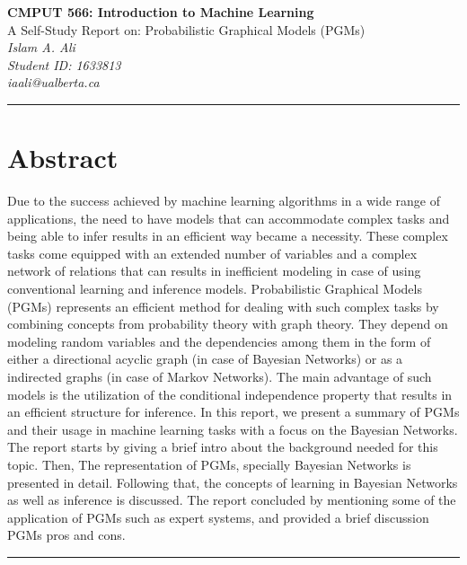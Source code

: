 \documentclass{article}
\begin{document}
\begin{center}
{\bf CMPUT 566: Introduction to Machine Learning}  \\
{A Self-Study Report on: Probabilistic Graphical Models (PGMs)} \\
\vspace{.1in}
{\em Islam A. Ali}\\
{\em Student ID: 1633813}\\
{\em iaali@ualberta.ca}\\
\end{center}
\noindent\rule{\textwidth}{1pt}

\section*{Abstract}
Due to the success achieved by machine learning algorithms in a wide range of applications, the need to have models that can accommodate complex tasks and being able to infer results in an efficient way became a necessity. These complex tasks come equipped with an extended number of variables and a complex network of relations that can results in inefficient modeling in case of using conventional learning and inference models. Probabilistic Graphical Models (PGMs) represents an efficient method for dealing with such complex tasks by combining concepts from probability theory with graph theory. They depend on modeling random variables and the dependencies among them in the form of either a directional acyclic graph (in case of Bayesian Networks) or as a indirected graphs (in case of Markov Networks). The main advantage of such models is the utilization of the conditional independence property that results in an efficient structure for inference. In this report, we present a summary of PGMs and their usage in machine learning tasks with a focus on the Bayesian Networks. The report starts by giving a brief intro about the background needed for this topic. Then, The representation of PGMs, specially Bayesian Networks is presented in detail. Following that, the concepts of learning in Bayesian Networks as well as inference is discussed. The report concluded by mentioning some of the application of PGMs such as expert systems, and provided a brief discussion PGMs pros and cons.  

\noindent\rule{\textwidth}{1pt}
\end{document}
